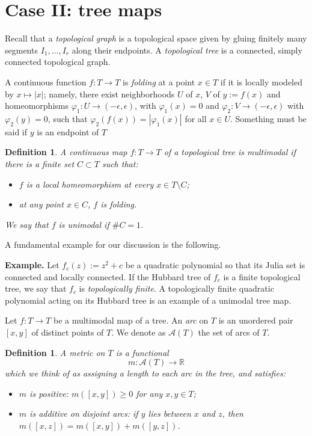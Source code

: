 \documentclass[11pt]{amsart}
\newtheorem{definition}[theorem]{Definition}
\begin{document}
\section{Case II: tree maps}

Recall that a \emph{topological graph} is a topological space given by gluing finitely many segments 
$I_1, \dots, I_r$ along their endpoints. A \emph{topological tree} is a connected, simply connected topological graph.

A continuous function $f : T \to T$ is \emph{folding} at a point $x \in T$ if it is locally modeled by $x \mapsto |x|$; namely, there exist neighborhoods $U$ of $x$, $V$ of $y := f(x)$ and homeomorphisms 
$\varphi_1 : U \to (- \epsilon, \epsilon)$, with $\varphi_1(x) = 0$ and $\varphi_2 : V \to (-\epsilon, \epsilon)$ with $\varphi_2(y) = 0$, such that 
$\varphi_2(f(x)) = |\varphi_1(x)|$ for all $x \in U$.
{\color{blue} Something must be said if $y$ is an endpoint of $T$}

\begin{definition}
A continuous map $f : T \to T$ of a topological tree is \emph{multimodal} if there is a finite set $C \subset T$ such that:  
\begin{itemize}
\item $f$ is a local homeomorphism at every $x \in T \setminus C$;
\item at any point $x \in C$,  $f$ is folding.
\end{itemize}
We say that $f$ is  \emph{unimodal} if $\# C = 1$.
\end{definition}

A fundamental example for our discussion is the following. 

\medskip \noindent \textbf{Example.} Let $f_c(z) := z^2  +c$ be a quadratic polynomial so that its Julia set is connected and locally connected. 
If the Hubbard tree of $f_c$ is a finite topological tree, we say that $f_c$ is \emph{topologically finite}. 
A topologically finite quadratic polynomial acting on its Hubbard tree is an example of a unimodal tree map. 
\medskip

Let $f : T \to T$ be a multimodal map of a tree. An \emph{arc} on $T$ is an unordered pair $[x, y]$ of distinct points of $T$.  
We denote as $\mathcal{A}(T)$ the set of arcs of $T$. 

\begin{definition}
A \emph{metric} on $T$   is a functional
$$m : \mathcal{A}(T) \to \mathbb{R}$$  
which we think of as assigning a \emph{length} to each arc in the tree, 
and satisfies:  
\begin{itemize}
\item[(i)] 
$m$ is \emph{positive}: $m([x,y]) \geq 0$ for any $x,y \in T$;  
\item[(ii)]
$m$ is \emph{additive} on disjoint arcs: if $y$ lies between $x$ and $z$, then $m([x,z]) = m([x,y]) + m([y, z])$.  
\end{itemize}
\end{definition}
\end{document}
